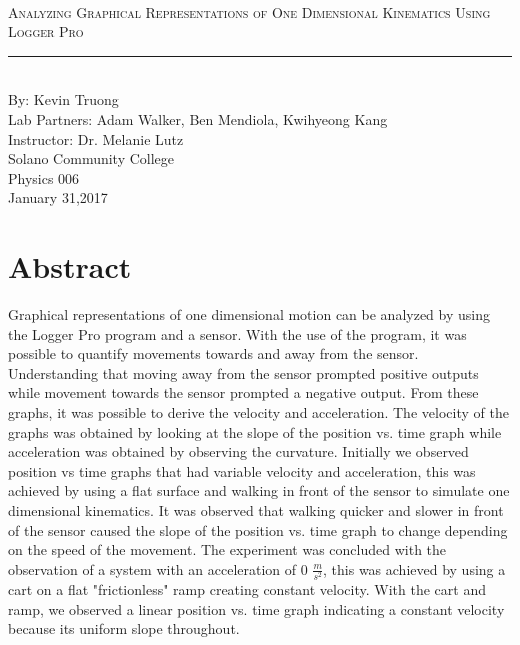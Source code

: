 \documentclass[aps,letterpaper,11pt]{revtex4}
\newcommand{\labno}{1}
\newcommand{\labtitle}{Analyzing Graphical Representations of One Dimensional Kinematics Using Logger Pro}
\newcommand{\authorname}{Kevin Truong}
\newcommand{\professor}{Dr. Melanie Lutz}
\newcommand{\classno}{Physics 006}
\newcommand{\labpartners}{Adam Walker, Ben Mendiola, Kwihyeong Kang}
\newcommand{\submitdate}{January 31,2017}
\begin{document}
\begin{titlepage}
\begin{center}
\hspace{-136mm}\boxed{{\Large \textsc{Lab No. \labno}}}\\\vspace{30mm}
{\Large \textsc{\labtitle} \\ \vspace{4pt}}
\rule[13pt]{\textwidth}{1pt}\\ \vspace{150pt}
{\large By: \authorname \\ \vspace{10pt}}
Lab Partners: \labpartners \\
Instructor: \professor \vspace{10pt} \\
Solano Community College\\ \classno \\ \vspace{10pt}
\submitdate
\end{center}
\end{titlepage}

\section{Abstract}

Graphical representations of one dimensional motion can be analyzed by using the Logger Pro program and a sensor. With the use of the program, it was possible to quantify movements towards and away from the sensor. Understanding that moving away from the sensor prompted positive outputs while movement towards the sensor prompted a negative output. From these graphs, it was possible to derive the velocity and acceleration. The velocity of the graphs was obtained by looking at the slope of the position vs. time graph while acceleration was obtained by observing the curvature. Initially we observed position vs time graphs that had variable velocity and acceleration, this was achieved by using a flat surface and walking in front of the sensor to simulate one dimensional kinematics. It was observed that walking quicker and slower in front of the sensor caused the slope of the position vs. time graph to change depending on the speed of the movement. The experiment was concluded with the observation of a system with an acceleration of 0 $\frac{m}{s^2}$, this was achieved by using a cart on a flat "frictionless" ramp creating constant velocity. With the cart and ramp, we observed a linear position vs. time graph indicating a constant velocity because its uniform slope throughout.
\end{document}
